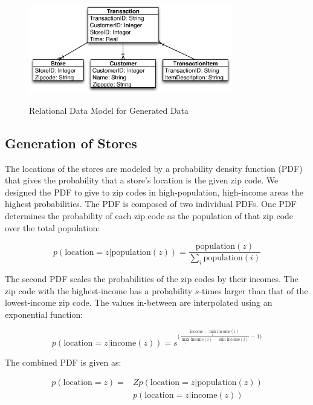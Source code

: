 \begin{figure}[!t]
  \centering
  \caption{Relational Data Model for Generated Data}
  \includegraphics[width=3.5in]{figures/bigpetstore/transactions_data_model.eps}
  \label{fig:relational-data-model}
\end{figure}

\subsection{Generation of Stores}
The locations of the stores are modeled by a probability density function (PDF) that gives the probability that a store's location is the given zip code. We designed the PDF to give to zip codes in high-population, high-income areas the highest probabilities. The PDF is composed of two individual PDFs. One PDF determines the probability of each zip code as the population of that zip code over the total population:

\begin{equation*}
p(\text{location}=z | \text{population}(z)) = \frac{\text{population}(z)}{\sum_{i} \text{population}(i)}
\end{equation*}

The second PDF scales the probabilities of the zip codes by their incomes.  The zip code with the highest-income has a probability $s$-times larger than that of the lowest-income zip code. The values in-between are interpolated using an exponential function:

\begin{equation*}
p(\text{location}=z | \text{income}(z)) = s ^ {\big( \frac{\text{income} - \min_i{\textrm{income}(i)}} {\max_i{\textrm{income}(i)} - \min_i{\textrm{income}(i)}} - 1 \big)}
\end{equation*}

The combined PDF is given as: 

\begin{align*}
p(\text{location}=z) = &Z p(\text{location}=z | \text{population}(z)) \\
&p(\text{location}=z | \text{income}(z))
\end{align*}


